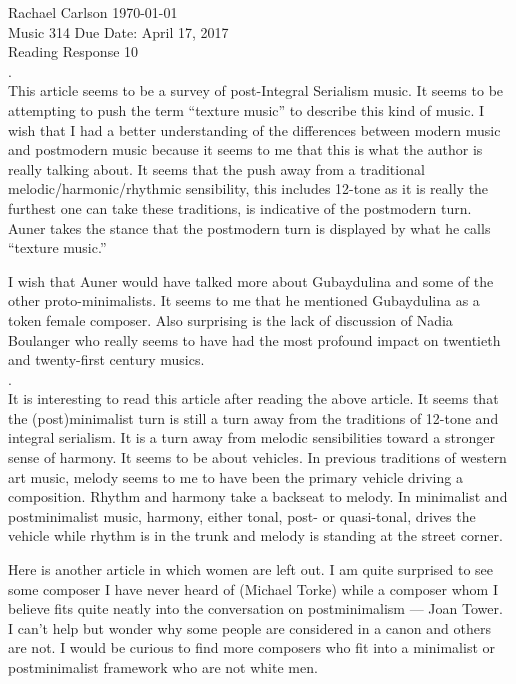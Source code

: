 \documentclass[12pt]{article}
\begin{document}
\noindent Rachael Carlson \hfill \today\\
Music 314 \hfill Due Date: April 17, 2017\\
Reading Response 10\\

\noindent {}.\\

\noindent This article seems to be a survey of post-Integral Serialism
music. It seems to be attempting to push the term ``texture music'' to
describe this kind of music. I wish that I had a better understanding of the
differences between modern music and postmodern music because it seems to me
that this is what the author is really talking about. It seems that the push
away from a traditional melodic/harmonic/rhythmic sensibility, this includes
12-tone as it is really the furthest one can take these traditions, is
indicative of the postmodern turn. Auner takes the stance that the postmodern
turn is displayed by what he calls ``texture music.'' 

I wish that Auner would have talked more about Gubaydulina and some of the
other proto-minimalists. It seems to me that he mentioned Gubaydulina as a
token female composer. Also surprising is the lack of discussion of Nadia
Boulanger who really seems to have had the most profound impact on twentieth
and twenty-first century musics.\\

\noindent {}.\\

It is interesting to read this article after reading the above article. It
seems that the (post)minimalist turn is still a turn away from the traditions
of 12-tone and integral serialism. It is a turn away from melodic
sensibilities toward a stronger sense of harmony. It seems to be about
vehicles. In previous traditions of western art music, melody seems to me to
have been the primary vehicle driving a composition. Rhythm and harmony take a
backseat to melody. In minimalist and postminimalist music, harmony, either
tonal, post- or quasi-tonal, drives the vehicle while rhythm is in the trunk
and melody is standing at the street corner. 

Here is another article in which women are left out. I am quite surprised to
see some composer I have never heard of (Michael Torke) while a composer whom
I believe fits quite neatly into the conversation on postminimalism --- Joan
Tower. I can't help but wonder why some people are considered in a canon and
others are not. I would be curious to find more composers who fit into a
minimalist or postminimalist framework who are not white men.  
\end{document}
